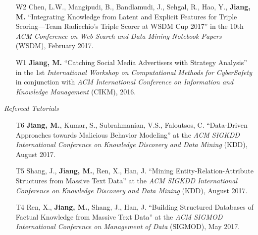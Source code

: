 \documentclass[10pt]{article}
\newenvironment{myindentpar}[1]%
{\begin{list}{}%
         {\setlength{\leftmargin}{#1}}%
         \item[]%
}
{\end{list}}
\newcounter{list}
\begin{document}
\begin{myindentpar}{0.00cm}
\begin{enumerate}[leftmargin=.5cm]
\vspace{-0.1cm}

\item[W2] Chen, L.W., Mangipudi, B., Bandlamudi, J., Sehgal, R., Hao, Y., \textbf{Jiang, M.} ``Integrating Knowledge from Latent and Explicit Features for Triple Scoring—Team Radicchio's Triple Scorer at WSDM Cup 2017'' in the 10th \textit{ACM Conference on Web Search and Data Mining Notebook Papers} (WSDM), February 2017.

\vspace{-0.1cm}

\item[W1] \textbf{Jiang, M.} ``Catching Social Media Advertisers with Strategy Analysis'' in the 1st \textit{International Workshop on Computational Methods for CyberSafety} in conjunction with \textit{ACM International Conference on Information and Knowledge Management} (CIKM), 2016.

\end{enumerate}

\hspace{-0.25cm}\emph{Refereed Tutorials}

\begin{enumerate}[leftmargin=.5cm]

\item[T6] \textbf{Jiang, M.}, Kumar, S., Subrahmanian, V.S., Faloutsos, C. ``Data-Driven Approaches towards Malicious Behavior Modeling'' at the \textit{ACM SIGKDD International Conference on Knowledge Discovery and Data Mining} (KDD), August 2017.

\item[T5] Shang, J., \textbf{Jiang, M.}, Ren, X., Han, J. ``Mining Entity-Relation-Attribute Structures from Massive Text Data'' at the \textit{ACM SIGKDD International Conference on Knowledge Discovery and Data Mining} (KDD), August 2017.

\item[T4] Ren, X., \textbf{Jiang, M.}, Shang, J., Han, J. ``Building Structured Databases of Factual Knowledge from Massive Text Data'' at the \textit{ACM SIGMOD International Conference on Management of Data} (SIGMOD), May 2017.
		

\end{enumerate}
\end{myindentpar}
\end{document}
